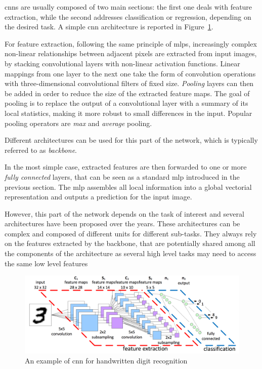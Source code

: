 \documentclass[%
    corpo=12pt,
    twoside,
    stile=classica,   
    tipotesi=magistrale,
    evenboxes,
    english,
	numerazioneromana,
]{toptesi}
\begin{document}
\bigskip
\Glspl{cnn} are usually composed of two main sections: the first one deals with feature extraction, while the second addresses classification or regression, depending on the desired task. A simple \gls{cnn} architecture is reported in Figure~\ref{fig:cnn}.

\medskip
For feature extraction, following the same principle of \glspl{mlp}, increasingly complex non-linear relationships between adjacent pixels are extracted from input images, by stacking convolutional layers with non-linear activation functions. Linear mappings from one layer to the next one take the form of convolution operations with three-dimensional convolutional filters of fixed size. \textit{Pooling} layers can then be added in order to reduce the size of the extracted feature maps. The goal of pooling is to replace the output of a convolutional layer with a summary of its local statistics, making it more robust to small differences in the input. Popular pooling operators are \textit{max} and \textit{average} pooling.

Different architectures can be used for this part of the network, which is typically referred to as \textit{backbone}.

\medskip
In the most simple case, extracted features are then forwarded to one or more \textit{fully connected} layers, that can be seen as a standard \gls{mlp} introduced in the previous section. The \gls{mlp} assembles all local information into a global vectorial representation and outputs a prediction for the input image.

However, this part of the network depends on the task of interest and several architectures have been proposed over the years. These architectures can be complex and composed of different units for different sub-tasks. They always rely on the features extracted by the backbone, that are potentially shared among all the components of the architecture as several high level tasks may need to access the same low level features

\begin{figure}
	\centering
	\includegraphics[width=.95\linewidth]{imgs/cnn.png}
	\caption{An example of \gls{cnn} for handwritten digit recognition}
	\label{fig:cnn}
\end{figure}
\end{document}
